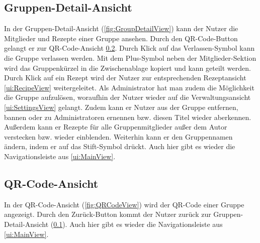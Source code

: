 \documentclass[parskip=full]{scrartcl}
\begin{document}
\subsection{Gruppen-Detail-Ansicht}
\label{ui:GroupDetailView}
In der Gruppen-Detail-Ansicht (\autoref{fig:GroupDetailView}) kann der Nutzer die Mitglieder und Rezepte einer Gruppe ansehen. Durch den QR-Code-Button gelangt er zur QR-Code-Ansicht \ref{ui:QRCodeView}. Durch Klick auf das Verlassen-Symbol kann die Gruppe verlassen werden. Mit dem Plus-Symbol neben der Mitglieder-Sektion wird das Gruppenkürzel in die Zwischenablage kopiert und kann geteilt werden. Durch Klick auf ein Rezept wird der Nutzer zur entsprechenden Rezeptansicht \ref{ui:RecipeView} weitergeleitet. Als Administrator hat man zudem die Möglichkeit die Gruppe aufzulösen, woraufhin der Nutzer wieder auf die Verwaltungsansicht \ref{ui:SettingsView} gelangt. Zudem kann er Nutzer aus der Gruppe entfernen, bannen oder zu Administratoren ernennen bzw. diesen Titel wieder aberkennen. Außerdem kann er Rezepte für alle Gruppenmitglieder außer dem Autor verstecken bzw. wieder einblenden. Weiterhin kann er den Gruppennamen ändern, indem er auf das Stift-Symbol drückt. Auch hier gibt es wieder die Navigationsleiste aus \ref{ui:MainView}.
\subsection{QR-Code-Ansicht}
\label{ui:QRCodeView}
In der QR-Code-Ansicht (\autoref{fig:QRCodeView}) wird der QR-Code einer Gruppe angezeigt. Durch den Zurück-Button kommt der Nutzer zurück zur Gruppen-Detail-Ansicht (\ref{ui:GroupDetailView}). Auch hier gibt es wieder die Navigationsleiste aus \ref{ui:MainView}.
\end{document}
